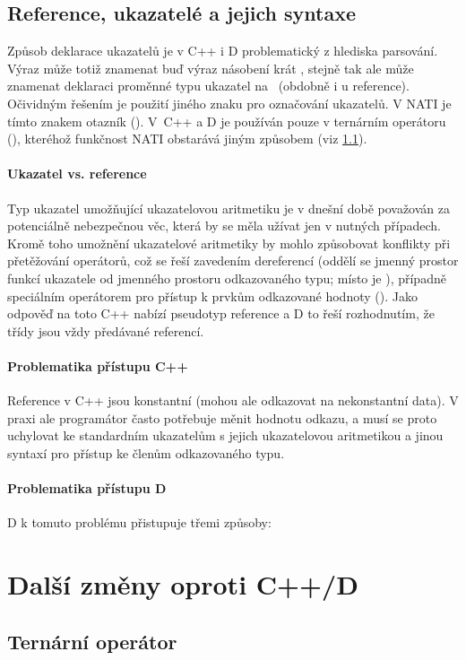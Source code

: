 \subsection{Reference, ukazatelé a jejich syntaxe} \label{pointers}
Způsob deklarace ukazatelů je v C++ i D problematický z hlediska parsování. Výraz  může totiž znamenat buď výraz násobení  krát , stejně tak ale může znamenat deklaraci proměnné  typu ukazatel na ~(obdobně i u reference). Očividným řešením je použití jiného znaku pro označování ukazatelů. V NATI je tímto znakem otazník (). V~C++ a D je používán pouze v ternárním operátoru (), kteréhož funkčnost NATI obstarává jiným způsobem (viz \ref{ternary}).

\paragraph{Ukazatel vs. reference}
Typ ukazatel umožňující ukazatelovou aritmetiku je v dnešní době považován za potenciálně nebezpečnou věc, která by se měla užívat jen v nutných případech. Kromě toho umožnění ukazatelové aritmetiky by mohlo způsobovat konflikty při přetěžování operátorů, což se řeší zavedením dereferencí (oddělí se jmenný prostor funkcí ukazatele od jmenného prostoru odkazovaného typu; místo  je ), případně speciálním operátorem pro přístup k prvkům odkazované hodnoty (). Jako odpověď na toto C++ nabízí pseudotyp reference a D to řeší rozhodnutím, že třídy jsou vždy předávané referencí.

\paragraph{Problematika přístupu C++} Reference v C++ jsou konstantní (mohou ale odkazovat na nekonstantní data). V praxi ale programátor často potřebuje měnit hodnotu odkazu, a musí se proto uchylovat ke standardním ukazatelům s jejich ukazatelovou aritmetikou a jinou syntaxí pro přístup ke členům odkazovaného typu.

\paragraph{Problematika přístupu D} D k tomuto problému přistupuje třemi způsoby:
\begin{compactenum}
	\item 
\end{compactenum}

\section{Další změny oproti C++/D}

\subsection{Ternární operátor} \label{ternary}

          
